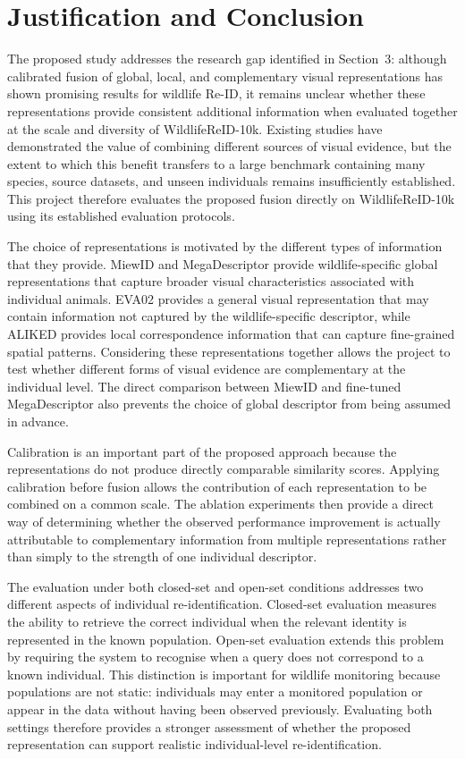\documentclass[runningheads]{llncs}
\begin{document}
\section{Justification and Conclusion}

The proposed study addresses the research gap identified in Section~3: although calibrated fusion
of global, local, and complementary visual representations has shown promising results for wildlife
Re-ID, it remains unclear whether these representations provide consistent additional information
when evaluated together at the scale and diversity of WildlifeReID-10k. Existing studies have
demonstrated the value of combining different sources of visual evidence, but the extent to which
this benefit transfers to a large benchmark containing many species, source datasets, and unseen
individuals remains insufficiently established. This project therefore evaluates the proposed
fusion directly on WildlifeReID-10k using its established evaluation protocols.

The choice of representations is motivated by the different types of information that they provide.
MiewID and MegaDescriptor provide wildlife-specific global representations that capture broader
visual characteristics associated with individual animals. EVA02 provides a general visual
representation that may contain information not captured by the wildlife-specific descriptor, while
ALIKED provides local correspondence information that can capture fine-grained spatial patterns.
Considering these representations together allows the project to test whether different forms of
visual evidence are complementary at the individual level. The direct comparison between MiewID and
fine-tuned MegaDescriptor also prevents the choice of global descriptor from being assumed in
advance.

Calibration is an important part of the proposed approach because the representations do not produce
directly comparable similarity scores. Applying calibration before fusion allows the contribution of
each representation to be combined on a common scale. The ablation experiments then provide a direct
way of determining whether the observed performance improvement is actually attributable to
complementary information from multiple representations rather than simply to the strength of one
individual descriptor.

The evaluation under both closed-set and open-set conditions addresses two different aspects of
individual re-identification. Closed-set evaluation measures the ability to retrieve the correct
individual when the relevant identity is represented in the known population. Open-set evaluation
extends this problem by requiring the system to recognise when a query does not correspond to a known
individual. This distinction is important for wildlife monitoring because populations are not static:
individuals may enter a monitored population or appear in the data without having been observed
previously. Evaluating both settings therefore provides a stronger assessment of whether the proposed
representation can support realistic individual-level re-identification.
\end{document}
